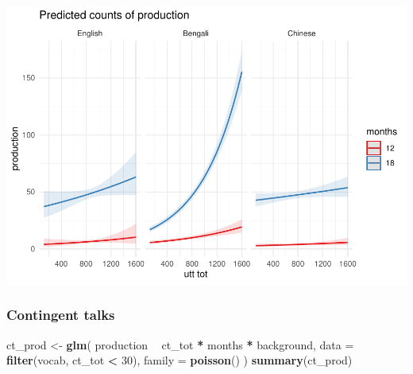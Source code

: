 \documentclass[]{article}
\newenvironment{Shaded}{\begin{snugshade}}{\end{snugshade}}
\newcommand{\DataTypeTok}[1]{\textcolor[rgb]{0.13,0.29,0.53}{#1}}
\newcommand{\DecValTok}[1]{\textcolor[rgb]{0.00,0.00,0.81}{#1}}
\newcommand{\KeywordTok}[1]{\textcolor[rgb]{0.13,0.29,0.53}{\textbf{#1}}}
\newcommand{\NormalTok}[1]{#1}
\newcommand{\OperatorTok}[1]{\textcolor[rgb]{0.81,0.36,0.00}{\textbf{#1}}}
\newcommand{\StringTok}[1]{\textcolor[rgb]{0.31,0.60,0.02}{#1}}
\begin{document}
\includegraphics{supplement_files/figure-latex/utt-lm-2-undsay-plot-1.pdf}

\hypertarget{contingent-talks-1}{%
\subsubsection{Contingent talks}\label{contingent-talks-1}}

\begin{Shaded}
\begin{Highlighting}[]
\NormalTok{ct_prod <-}\StringTok{ }\KeywordTok{glm}\NormalTok{(}
\NormalTok{  production }\OperatorTok{~}
\StringTok{    }\NormalTok{ct_tot }\OperatorTok{*}
\StringTok{    }\NormalTok{months }\OperatorTok{*}
\StringTok{    }\NormalTok{background,}
  \DataTypeTok{data =} \KeywordTok{filter}\NormalTok{(vocab, ct_tot }\OperatorTok{<}\StringTok{ }\DecValTok{30}\NormalTok{),}
  \DataTypeTok{family =} \KeywordTok{poisson}\NormalTok{()}
\NormalTok{)}
\KeywordTok{summary}\NormalTok{(ct_prod)}
\end{Highlighting}
\end{Shaded}
\end{document}
